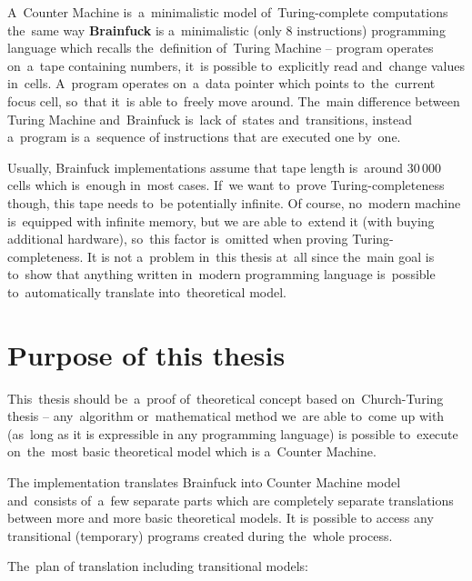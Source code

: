 \documentclass[english,shortabstract,mgr]{iithesis}
\begin{document}
A~Counter Machine is~a~minimalistic model of~Turing-complete computations the~same way
\textbf{Brainfuck} \cite{brainfuckWiki} is a~minimalistic (only 8 instructions) programming
language which recalls
the~definition of~Turing Machine -- program operates on~a~tape containing numbers, it~is possible
to~explicitly read and~change values in~cells. A~program operates on~a~data pointer which
points to~the~current focus cell, so~that it~is able to~freely move around. The~main difference
between Turing Machine and~Brainfuck is~lack of~states and~transitions, instead a~program
is a~sequence of instructions that are executed one by~one.

Usually, Brainfuck implementations assume that tape length is~around $30\,000$ cells which
is~enough in~most cases. If~we want to~prove Turing-completeness though, this tape
needs to~be potentially infinite. Of course, no~modern machine is~equipped with infinite memory,
but we are able to~extend it (with buying additional hardware), so~this factor is~omitted
when proving Turing-completeness. It is not a~problem in~this thesis at~all since
the~main goal is to~show that anything written in~modern programming language is~possible
to~automatically translate into~theoretical model.

\section {Purpose of this thesis}

This~thesis should be~a~proof of~theoretical concept based on~Church-Turing thesis -- any~algorithm
or~mathematical method we~are able to~come up with (as~long as it is expressible in any programming
language) is possible to~execute on~the~most basic theoretical model which is a~Counter Machine.

The implementation translates Brainfuck into Counter Machine model and~consists of~a~few separate parts
which are completely separate translations between more and more basic theoretical models.
It is possible to access any transitional (temporary) programs created during the~whole process.

The~plan of translation including transitional models:

\hspace{-1.5cm}
\end{document}
